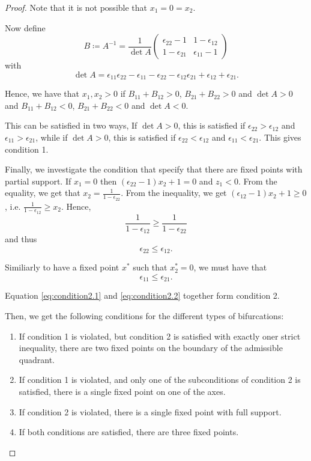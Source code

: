 \documentclass{article} %
\newcounter{ct}
\theoremstyle{definition}
\theoremstyle{remark}
\begin{document}
\begin{proof}
Note that it is not possible that $x_1=0=x_2$.

Now define
\[
B\coloneqq A^{-1} = \frac{1}{\det A}
\begin{pmatrix}
\epsilon_{22}-1  &  1-\epsilon_{12} \\
1-\epsilon_{21}  &  \epsilon_{11}-1
\end{pmatrix}
\]
with \[\det A = \epsilon_{11}\epsilon_{22}-\epsilon_{11}-\epsilon_{22}-\epsilon_{12}\epsilon_{21}+\epsilon_{12}+\epsilon_{21}.\]

Hence, we have that $x_1,x_2>0$ if $B_{11}+B_{12}>0$, $B_{21}+B_{22}>0$ and $\det A >0$ 
and $B_{11}+B_{12}<0$, $B_{21}+B_{22}<0$ and $\det A <0$.

This can be satisfied in two ways, 
If $\det A >0$, this is satisfied if $\epsilon_{22}>\epsilon_{12}$ and $\epsilon_{11}>\epsilon_{21}$,
while if $\det A >0$, this is satisfied if $\epsilon_{22}<\epsilon_{12}$ and $\epsilon_{11}<\epsilon_{21}$.
This gives condition 1. %



Finally, we investigate the condition that specify that there are fixed points with partial support.
If $x_1=0$ then $(\epsilon_{22}-1)x_2+1=0$ and $z_1<0$. 
From the equality, we get that $x_{2}=\frac{1}{1-\epsilon_{22}}$.
From the inequality, we get  $(\epsilon_{12}-1)x_2+1\geq 0$, i.e. $\frac{1}{1-\epsilon_{12}}\geq x_2$.
Hence, 
\begin{equation*}
\frac{1}{1-\epsilon_{12}}\geq\frac{1}{1-\epsilon_{22}}
\end{equation*}
and thus
\begin{equation}\label{eq:condition2.1}
\epsilon_{22} \leq \epsilon_{12}.
\end{equation}

Similiarly to have a fixed point $x^*$ such that $x_2^*=0$, we must have that 
\begin{equation}\label{eq:condition2.2}
\epsilon_{11} \leq \epsilon_{21}.
\end{equation}

Equation \ref{eq:condition2.1} and \ref{eq:condition2.2} together form condition 2.


Then, we get the following conditions for the different types of bifurcations:
\begin{enumerate}
\item  If condition 1 is violated, but condition 2 is satisfied with exactly oner strict inequality, there are two fixed points on the boundary of the admissible quadrant.
\item If condition 1 is violated, and only one of the subconditions of condition 2 is satisfied, there is a single fixed point on one of the axes.
\item If condition 2 is violated, there is a single fixed point with full support.
\item If both conditions are satisfied, there are three fixed points.
\end{enumerate}



\end{proof}
\end{document}
